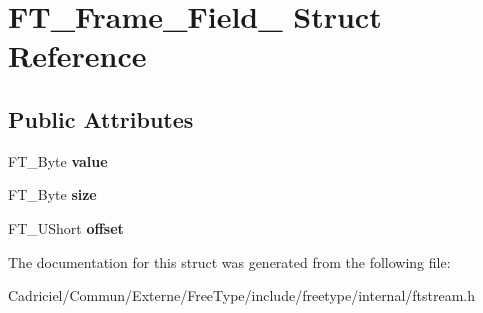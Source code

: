 \hypertarget{struct_f_t___frame___field__}{}\section{F\+T\+\_\+\+Frame\+\_\+\+Field\+\_\+ Struct Reference}
\label{struct_f_t___frame___field__}
\subsection*{Public Attributes}
\begin{DoxyCompactItemize}
\item 
F\+T\+\_\+\+Byte {\bfseries value}\hypertarget{struct_f_t___frame___field___a10f91dcdd0a582727b67ad45d42bab41}{}\label{struct_f_t___frame___field___a10f91dcdd0a582727b67ad45d42bab41}

\item 
F\+T\+\_\+\+Byte {\bfseries size}\hypertarget{struct_f_t___frame___field___a47e6fbcb90c079421d9d9b64f63a587e}{}\label{struct_f_t___frame___field___a47e6fbcb90c079421d9d9b64f63a587e}

\item 
F\+T\+\_\+\+U\+Short {\bfseries offset}\hypertarget{struct_f_t___frame___field___a85c3275fbb7044f7d6880020b6f0f794}{}\label{struct_f_t___frame___field___a85c3275fbb7044f7d6880020b6f0f794}

\end{DoxyCompactItemize}


The documentation for this struct was generated from the following file\+:\begin{DoxyCompactItemize}
\item 
Cadriciel/\+Commun/\+Externe/\+Free\+Type/include/freetype/internal/ftstream.\+h\end{DoxyCompactItemize}

